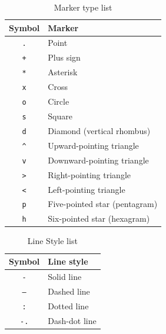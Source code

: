\begin{table}[htp]
\caption{Marker type list}
\begin{center}
\begin{tabular}{|c|l|}
\hline
\textbf{Symbol} & \textbf{Marker}\\
\hline
\texttt{.}  & Point\\
\texttt{+}  & Plus sign\\
\texttt{*}  & Asterisk\\
\texttt{x}  & Cross\\
\texttt{o}  & Circle\\
\texttt{s}  & Square\\
\texttt{d}  & Diamond (vertical rhombus)\\
\texttt{\textasciicircum} & Upward-pointing triangle\\
\texttt{v}  & Downward-pointing triangle\\
\texttt{\textgreater} & Right-pointing triangle\\
\texttt{\textless} & Left-pointing triangle\\
\texttt{p}  & Five-pointed star (pentagram)\\
\texttt{h}  & Six-pointed star (hexagram)\\
\hline
\end{tabular}
\end{center}
\label{markertype}
\end{table}


\begin{table}[htp]
\caption{Line Style list}
\begin{center}
\begin{tabular}{|c|l|}
\hline
\textbf{Symbol} & \textbf{Line style}\\
\hline
\texttt{-}  & Solid line\\
\texttt{--}  & Dashed line\\
\texttt{:}  & Dotted line\\
\texttt{-.}  & Dash-dot line\\
\hline
\end{tabular}
\end{center}
\label{markertype}
\end{table}


